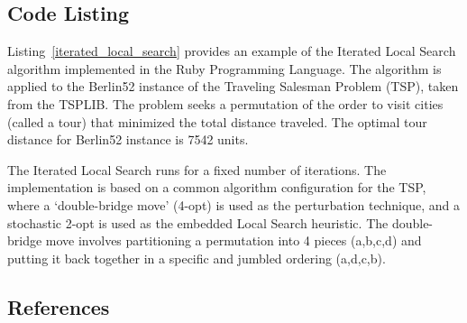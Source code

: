 \subsection{Code Listing}
Listing~\ref{iterated_local_search} provides an example of the Iterated Local Search algorithm implemented in the Ruby Programming Language. 
The algorithm is applied to the Berlin52 instance of the Traveling Salesman Problem (TSP), taken from the TSPLIB. The problem seeks a permutation of the order to visit cities (called a tour) that minimized the total distance traveled. The optimal tour distance for Berlin52 instance is 7542 units.

The Iterated Local Search runs for a fixed number of iterations. The implementation is based on a common algorithm configuration for the TSP, where a `double-bridge move' (4-opt) is used as the perturbation technique, and a stochastic 2-opt is used as the embedded Local Search heuristic.
The double-bridge move involves partitioning a permutation into 4 pieces (a,b,c,d) and putting it back together in a specific and jumbled ordering (a,d,c,b).



\subsection{References}

% 
% 
